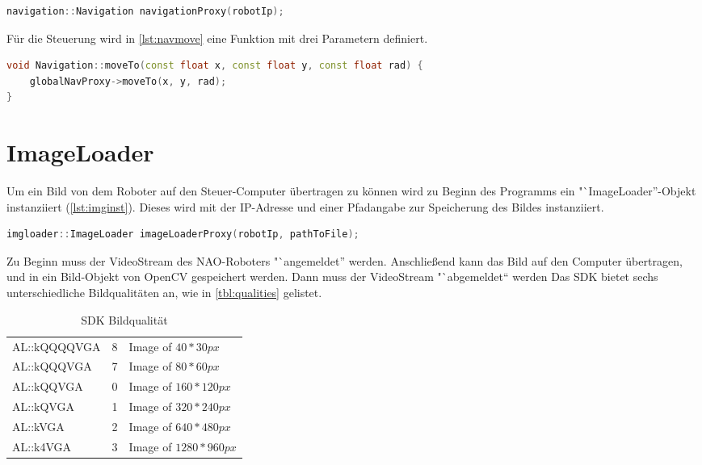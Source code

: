 \begin{lstlisting}[language=c++,
                   caption={Navigation Instanziierung},
                   label={lst:navinst}]
navigation::Navigation navigationProxy(robotIp);
\end{lstlisting}

        Für die Steuerung wird in \autoref{lst:navmove} eine Funktion mit drei
        Parametern definiert.

\begin{lstlisting}[language=c++,
                   caption={Funktion: "`moveTo''},
                   label={lst:navmove}]
void Navigation::moveTo(const float x, const float y, const float rad) {
    globalNavProxy->moveTo(x, y, rad);
}
\end{lstlisting}

    \section{ImageLoader}

        Um ein Bild von dem Roboter auf den Steuer-Computer übertragen zu können
        wird zu Beginn des Programms ein "`ImageLoader''-Objekt instanziiert
        (\autoref{lst:imginst}).
        Dieses wird mit der \ac{IP}-Adresse und einer Pfadangabe zur Speicherung
        des Bildes instanziiert.

\begin{lstlisting}[language=c++,
                   caption={ImageLoader Instanziierung},
                   label={lst:imginst}]
imgloader::ImageLoader imageLoaderProxy(robotIp, pathToFile);
\end{lstlisting}

        Zu Beginn muss der VideoStream des NAO-Roboters "`angemeldet'' werden.
        Anschließend kann das Bild auf den Computer übertragen, und in ein
        Bild-Objekt von OpenCV gespeichert werden.
        Dann muss der VideoStream "`abgemeldet“ werden
        Das SDK bietet sechs unterschiedliche Bildqualitäten an, wie in
        \autoref{tbl:qualities} gelistet.

        \begin{table}[h]
            \caption{SDK Bildqualität}
            \label{tbl:qualities}
            \begin{center}
                \begin{tabular}[]{| l | l | l |}
                    AL::kQQQQVGA & 8 & Image of $40 * 30px$ \\
                    AL::kQQQVGA  & 7 & Image of $80 * 60px$ \\
                    AL::kQQVGA   & 0 & Image of $160 * 120px$ \\
                    AL::kQVGA    & 1 & Image of $320 * 240px$ \\
                    AL::kVGA     & 2 & Image of $640 * 480px$ \\
                    AL::k4VGA    & 3 & Image of $1280 * 960px$ \\
                \end{tabular}
            \end{center}
        \end{table}

